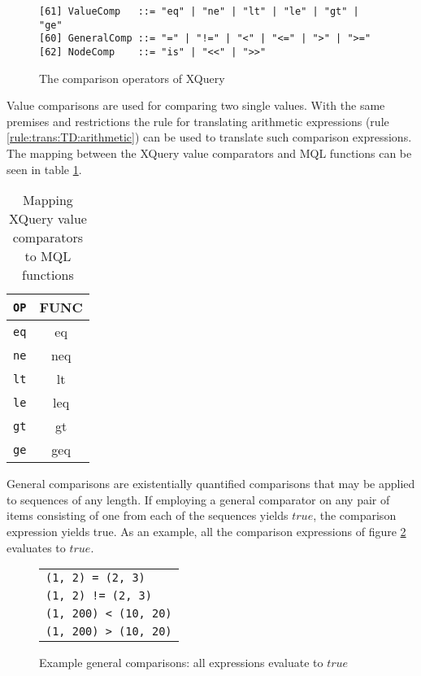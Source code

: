 \begin{figure}[h]
\begin{Verbatim}
[61] ValueComp   ::= "eq" | "ne" | "lt" | "le" | "gt" | "ge"
[60] GeneralComp ::= "=" | "!=" | "<" | "<=" | ">" | ">="
[62] NodeComp    ::= "is" | "<<" | ">>"
\end{Verbatim}
\caption{The comparison operators of XQuery}
\label{fig:trans:TD:compEBNF}
\end{figure}

Value comparisons are used for comparing two single values. With the same premises and restrictions the rule for
translating arithmetic expressions (rule \ref{rule:trans:TD:arithmetic}) can be used to translate such comparison
expressions. The mapping between the XQuery value comparators and MQL functions can be seen in table
\ref{tab:trans:TD:valueComp}.

\begin{table}[h]
\centering
\begin{tabular}{c|c}
\texttt{OP} & \textsf{FUNC} \\ \hline
\texttt{eq} & \textsf{eq} \\
\texttt{ne} & \textsf{neq} \\
\texttt{lt} & \textsf{lt} \\
\texttt{le} & \textsf{leq} \\
\texttt{gt} & \textsf{gt} \\
\texttt{ge} & \textsf{geq} \\
\end{tabular}
\label{tab:trans:TD:valueComp}
\caption{Mapping XQuery value comparators to MQL functions}
\end{table}

General comparisons are existentially quantified comparisons that may be applied to sequences of any length. If
employing a general comparator on any pair of items consisting of one from each of the sequences yields $true$,
the comparison expression yields true. As an example, all the comparison expressions of figure
\ref{fig:trans:TD:genCompEx} evaluates to $true$.

\begin{figure}[h]
\centering
\begin{tabular}{l}
\texttt{(1, 2) = (2, 3)} \\
\texttt{(1, 2) != (2, 3)} \\
\texttt{(1, 200) < (10, 20)} \\
\texttt{(1, 200) > (10, 20)} \\
\end{tabular}
\label{fig:trans:TD:genCompEx}
\caption[Example general comparisons]{Example general comparisons: all expressions evaluate to $true$}
\end{figure}

